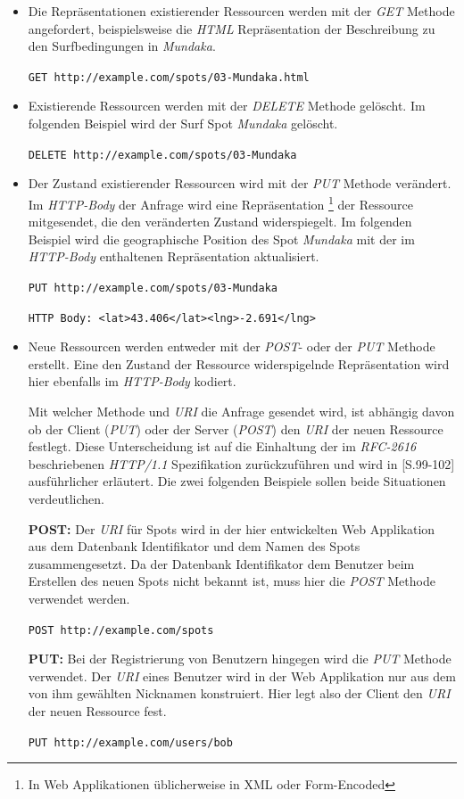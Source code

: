 \begin{itemize}
\item Die Repräsentationen existierender Ressourcen werden mit der
  \textit{GET} Methode angefordert, beispielsweise die \textit{HTML}
  Repräsentation der Beschreibung zu den Surfbedingungen in
  \textit{Mundaka}.

  \texttt{GET http://example.com/spots/03-Mundaka.html}

\item Existierende Ressourcen werden mit der \textit{DELETE} Methode
  gelöscht. Im folgenden Beispiel wird der Surf Spot \textit{Mundaka}
  gelöscht.

  \texttt{DELETE http://example.com/spots/03-Mundaka}

\item Der Zustand existierender Ressourcen wird mit der \textit{PUT}
  Methode verändert. Im \textit{HTTP-Body} der Anfrage wird eine
  Repräsentation \footnote{In Web Applikationen üblicherweise in XML
    oder Form-Encoded} der Ressource mitgesendet, die den veränderten
  Zustand widerspiegelt. Im folgenden Beispiel wird die geographische
  Position des Spot \textit{Mundaka} mit der im \textit{HTTP-Body}
  enthaltenen Repräsentation aktualisiert.

  \texttt{PUT http://example.com/spots/03-Mundaka}

  \texttt{HTTP Body: <lat>43.406</lat><lng>-2.691</lng>}


\item Neue Ressourcen werden entweder mit der \textit{POST}- oder der
  \textit{PUT} Methode erstellt. Eine den Zustand der Ressource
  widerspigelnde Repräsentation wird hier ebenfalls im
  \textit{HTTP-Body} kodiert.

  Mit welcher Methode und \textit{URI} die Anfrage gesendet wird, ist
  abhängig davon ob der Client (\textit{PUT}) oder der Server
  (\textit{POST}) den \textit{URI} der neuen Ressource festlegt. Diese
  Unterscheidung ist auf die Einhaltung der im \textit{RFC-2616}
   beschriebenen
  \textit{HTTP/1.1} Spezifikation zurückzuführen und wird in
  \cite{Richardson07}[S.99-102] ausführlicher erläutert. Die zwei
  folgenden Beispiele sollen beide Situationen verdeutlichen.

  \textbf{POST:} Der \textit{URI} für Spots wird in der hier
  entwickelten Web Applikation aus dem Datenbank Identifikator und dem
  Namen des Spots zusammengesetzt. Da der Datenbank Identifikator dem
  Benutzer beim Erstellen des neuen Spots nicht bekannt ist, muss hier
  die \textit{POST} Methode verwendet werden.

  \texttt{POST http://example.com/spots}

  \textbf{PUT:} Bei der Registrierung von Benutzern hingegen wird die
  \textit{PUT} Methode verwendet. Der \textit{URI} eines Benutzer wird
  in der Web Applikation nur aus dem von ihm gewählten Nicknamen
  konstruiert. Hier legt also der Client den \textit{URI} der neuen
  Ressource fest.

  \texttt{PUT http://example.com/users/bob}

\end{itemize}

